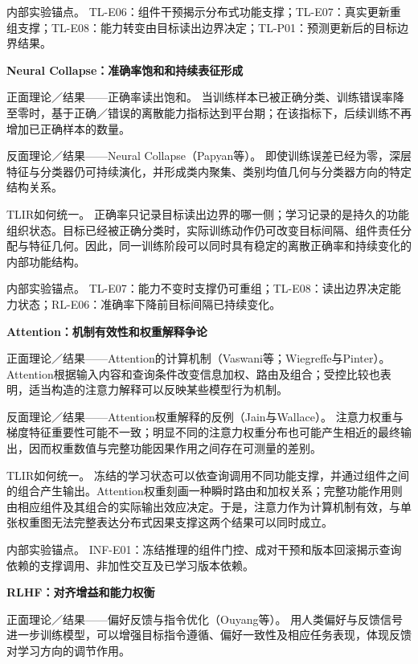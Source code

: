 内部实验锚点。 TL-E06：组件干预揭示分布式功能支撑；TL-E07：真实更新重组支撑；TL-E08：能力转变由目标读出边界决定；TL-P01：预测更新后的目标边界结果。

\noindent\textbf{Neural Collapse：准确率饱和和持续表征形成}\par

正面理论／结果——正确率读出饱和。 当训练样本已被正确分类、训练错误率降至零时，基于正确／错误的离散能力指标达到平台期；在该指标下，后续训练不再增加已正确样本的数量。

反面理论／结果——Neural Collapse（Papyan等）。 \cite{papyan2020} 即使训练误差已经为零，深层特征与分类器仍可持续演化，并形成类内聚集、类别均值几何与分类器方向的特定结构关系。

TLIR如何统一。 正确率只记录目标读出边界的哪一侧；学习记录的是持久的功能组织状态。目标已经被正确分类时，实际训练动作仍可改变目标间隔、组件责任分配与特征几何。因此，同一训练阶段可以同时具有稳定的离散正确率和持续变化的内部功能结构。

内部实验锚点。 TL-E07：能力不变时支撑仍可重组；TL-E08：读出边界决定能力状态；RL-E06：准确率下降前目标间隔已持续变化。

\noindent\textbf{Attention：机制有效性和权重解释争论}\par

正面理论／结果——Attention的计算机制（Vaswani等；Wiegreffe与Pinter）。 \cite{vaswani2017,wiegreffe2019} Attention根据输入内容和查询条件改变信息加权、路由及组合；受控比较也表明，适当构造的注意力解释可以反映某些模型行为机制。

反面理论／结果——Attention权重解释的反例（Jain与Wallace）。 \cite{jain2019} 注意力权重与梯度特征重要性可能不一致；明显不同的注意力权重分布也可能产生相近的最终输出，因而权重数值与完整功能因果作用之间存在可测量的差别。

TLIR如何统一。 冻结的学习状态可以依查询调用不同功能支撑，并通过组件之间的组合产生输出。Attention权重刻画一种瞬时路由和加权关系；完整功能作用则由相应组件及其组合的实际输出效应决定。于是，注意力作为计算机制有效，与单张权重图无法完整表达分布式因果支撑这两个结果可以同时成立。

内部实验锚点。 INF-E01：冻结推理的组件门控、成对干预和版本回滚揭示查询依赖的支撑调用、非加性交互及已学习版本依赖。

\noindent\textbf{RLHF：对齐增益和能力权衡}\par

正面理论／结果——偏好反馈与指令优化（Ouyang等）。 \cite{ouyang2022} 用人类偏好与反馈信号进一步训练模型，可以增强目标指令遵循、偏好一致性及相应任务表现，体现反馈对学习方向的调节作用。

